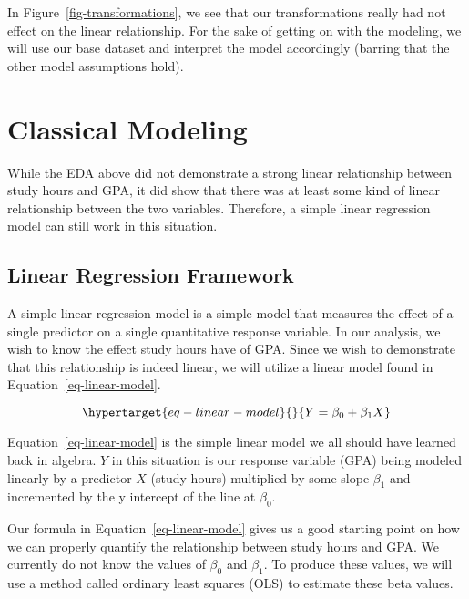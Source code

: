 \documentclass[
  letterpaper,
  DIV=11,
  numbers=noendperiod]{scrreprt}
\begin{document}
In Figure~\ref{fig-transformations}, we see that our transformations
really had not effect on the linear relationship. For the sake of
getting on with the modeling, we will use our base dataset and interpret
the model accordingly (barring that the other model assumptions hold).

\hypertarget{classical-modeling}{%
\section{Classical Modeling}\label{classical-modeling}}

While the EDA above did not demonstrate a strong linear relationship
between study hours and GPA, it did show that there was at least some
kind of linear relationship between the two variables. Therefore, a
simple linear regression model can still work in this situation.

\hypertarget{linear-regression-framework}{%
\subsection{Linear Regression
Framework}\label{linear-regression-framework}}

A simple linear regression model is a simple model that measures the
effect of a single predictor on a single quantitative response variable.
In our analysis, we wish to know the effect study hours have of GPA.
Since we wish to demonstrate that this relationship is indeed linear, we
will utilize a linear model found in Equation~\ref{eq-linear-model}.

\begin{equation}\protect\hypertarget{eq-linear-model}{}{
Y = \beta_0 + \beta_1X
}\label{eq-linear-model}\end{equation}

Equation~\ref{eq-linear-model} is the simple linear model we all should
have learned back in algebra. \(Y\) in this situation is our response
variable (GPA) being modeled linearly by a predictor \(X\) (study hours)
multiplied by some slope \(\beta_1\) and incremented by the y intercept
of the line at \(\beta_0\).

Our formula in Equation~\ref{eq-linear-model} gives us a good starting
point on how we can properly quantify the relationship between study
hours and GPA. We currently do not know the values of \(\beta_0\) and
\(\beta_1\). To produce these values, we will use a method called
ordinary least squares (OLS) to estimate these beta values.
\end{document}

